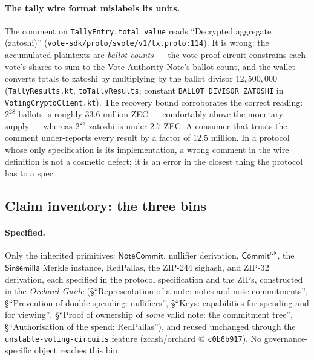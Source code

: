 \documentclass[11pt,a4paper]{article}
\theoremstyle{definition}
\newcommand{\NoteCommit}{\ensuremath{\mathsf{NoteCommit}}}
\newcommand{\Sinsemilla}{\ensuremath{\mathsf{Sinsemilla}}}
\newcommand{\CommitIvk}{\ensuremath{\mathsf{Commit}^{\mathsf{ivk}}}}
\begin{document}
\paragraph{The tally wire format mislabels its units.} The comment on
\texttt{TallyEntry.total\_value} reads ``Decrypted aggregate (zatoshi)''
(\texttt{vote-sdk/proto/svote/v1/tx.proto:114}). It is wrong: the
accumulated plaintexts are \emph{ballot counts} --- the vote-proof circuit
constrains each vote's shares to sum to the Vote Authority Note's ballot
count, and the wallet converts totals to zatoshi by multiplying by the
ballot divisor $12{,}500{,}000$ (\texttt{TallyResults.kt},
\texttt{toTallyResults}; constant \texttt{BALLOT\_DIVISOR\_ZATOSHI} in
\texttt{VotingCryptoClient.kt}). The recovery bound corroborates the
correct reading: $2^{28}$ ballots is roughly $33.6$ million ZEC ---
comfortably above the monetary supply --- whereas $2^{28}$ zatoshi is
under $2.7$ ZEC. A consumer that trusts the comment under-reports every
result by a factor of $12.5$ million. In a protocol whose only
specification is its implementation, a wrong comment in the wire
definition is not a cosmetic defect; it is an error in the closest thing
the protocol has to a spec.

\subsection{Claim inventory: the three bins}\label{sec:vote-inventory}

\paragraph{Specified.} Only the inherited primitives: \NoteCommit{},
nullifier derivation, \CommitIvk{}, the \Sinsemilla{} Merkle instance,
RedPallas, the ZIP-244 sighash, and ZIP-32 derivation, each specified in
the protocol specification and the ZIPs, constructed in the \emph{Orchard
Guide} (\S``Representation of a note: notes and note commitments'',
\S``Prevention of double-spending: nullifiers'', \S``Keys: capabilities
for spending and for viewing'', \S``Proof of ownership of \emph{some}
valid note: the commitment tree'', \S``Authorisation of the spend:
RedPallas''), and reused unchanged through the
\texttt{unstable-voting-circuits} feature (zcash/orchard @
\texttt{c0b6b917}). No governance-specific object reaches this bin.
\end{document}
